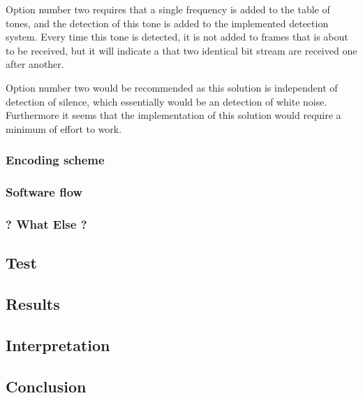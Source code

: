 		Option number two requires that a single frequency is added to the table of tones, and the detection of this tone is added to the implemented
		detection system. Every time this tone is detected, it is not added to frames that is about to be received, but it will indicate a that two
		identical bit stream are received one after another.
		
		Option number two would be recommended as this solution is independent of detection of silence, which essentially would be an detection of
		white noise. Furthermore it seems that the implementation of this solution would require a minimum of effort to work.		
		
		\subsubsection{Encoding scheme}
		
		
		\subsubsection{Software flow}
				
		\subsubsection{? What Else ?}
		
	\subsection{Test}
	
	\subsection{Results}
	
	\subsection{Interpretation}
	
	\subsection{Conclusion}